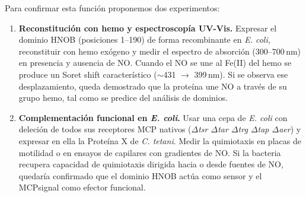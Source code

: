 Para confirmar esta función proponemos dos experimentos:

\begin{enumerate}
  \item \textbf{Reconstitución con hemo y espectroscopía UV-Vis.} Expresar el dominio HNOB
        (posiciones 1--190) de forma recombinante en \textit{E. coli}, reconstituir con hemo
        exógeno y medir el espectro de absorción (300--700\,nm) en presencia y ausencia de NO.
        Cuando el NO se une al Fe(II) del hemo se produce un Soret shift característico
        ($\sim$431 $\rightarrow$ 399\,nm). Si se observa ese desplazamiento, queda demostrado que
        la proteína une NO a través de su grupo hemo, tal como se predice del análisis de dominios.

  \item \textbf{Complementación funcional en \textit{E. coli}.} Usar una cepa de \textit{E. coli}
        con deleción de todos sus receptores MCP nativos (\textit{$\Delta$tsr $\Delta$tar $\Delta$trg
        $\Delta$tap $\Delta$aer}) y expresar en ella la Proteína X de \textit{C. tetani}. Medir la
        quimiotaxis en placas de motilidad o en ensayos de capilares con gradientes de NO. Si la
        bacteria recupera capacidad de quimiotaxis dirigida hacia o desde fuentes de NO, quedaría
        confirmado que el dominio HNOB actúa como sensor y el MCPsignal como efector funcional.
\end{enumerate}
